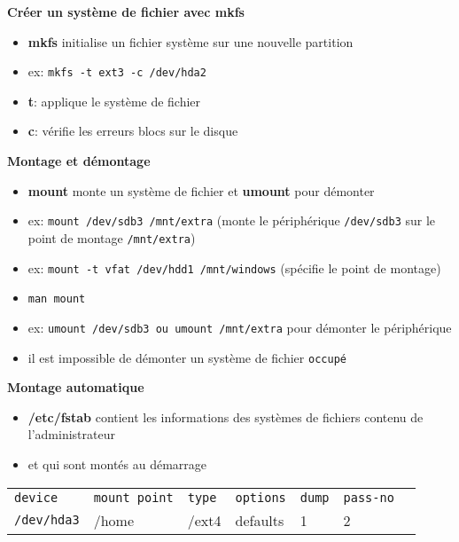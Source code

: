 \documentclass[french]{beamer}
\begin{document}
\begin{frame}
\textbf{Créer un système de fichier avec mkfs}
\begin{itemize}
\item \textbf{mkfs} initialise un fichier système sur une nouvelle partition
\item ex: \texttt{mkfs -t ext3 -c /dev/hda2}
\item \textbf{t}: applique le système de fichier
\item \textbf{c}: vérifie les erreurs blocs sur le disque
\end{itemize}
\end{frame}

\begin{frame}
\textbf{Montage et démontage}
\begin{itemize}
\item \textbf{mount} monte un système de fichier et \textbf{umount} pour démonter
\item ex: \texttt{mount /dev/sdb3 /mnt/extra} (monte le périphérique
\texttt{/dev/sdb3} sur le point de montage \texttt{/mnt/extra})
\item ex: \texttt{mount -t vfat /dev/hdd1 /mnt/windows} (spécifie le point de
montage)
\item \texttt{man mount}
\item ex: \texttt{umount /dev/sdb3 ou umount /mnt/extra} pour démonter le périphérique
\item il est impossible de démonter un système de fichier \texttt{occupé}
\end{itemize}
\end{frame}

\begin{frame}
\textbf{Montage automatique}
\begin{itemize}
\item \textbf{/etc/fstab} contient les informations des systèmes de fichiers
contenu de l'administrateur
\item et qui sont montés au démarrage
\end{itemize}
\begin{tabular}{l l l l l l l}
\texttt{device} & \texttt{mount point} & \texttt{type} &
\texttt{options} & \texttt{dump} & \texttt{pass-no}\\
\texttt{/dev/hda3} & /home & /ext4 & defaults & 1 & 2
\end{tabular}
\end{frame}
\end{document}
